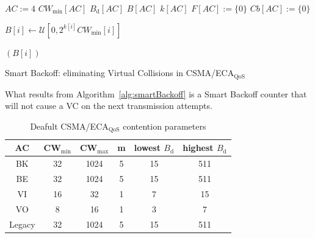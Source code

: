 
\begin{center}
\begin{minipage}{0.7\linewidth}
	\begin{algorithm}[H]
		$AC:=4$
		$CW_{\min}[AC]$
		$B_{\text{d}}[AC]$
		$B[AC]$
		$k[AC]$
		$F[AC]:=\{0\}$\;
		$Cb[AC]:=\{0\}$\;
		\tcp{}\tcp{}
		{
			$B[i]\gets\mathcal{U}[0,2^{k[i]}{CW_{\min}[i]}]$\;
			{
			}
			
			
		}
		\Return $(B[i])$\;
		\vspace{0.2cm}
		\caption{Smart Backoff: eliminating Virtual Collisions in CSMA/ECA$_{\text{QoS}}$}
		\label{alg:smartBackoff}
	\end{algorithm}
\end{minipage}
\end{center}

What results from Algorithm~\ref{alg:smartBackoff} is a Smart Backoff counter that will not cause a VC on the next transmission attempts.

	\begin{table}[tb]
		\centering
		\caption{Deafult CSMA/ECA$_{\text{QoS}}$ contention parameters}
		\label{tab:ecaQosParams}
		\begin{tabular}{|c|c|c|c|c|c|}
			\hline
			{\bfseries AC} & {\bfseries CW$_{\min}$} & {\bfseries CW$_{\max}$} & {\bfseries m} & {\bfseries lowest $B_{\text{d}}$} & {\bfseries highest $B_{\text{d}}$}\\
			\hline
			BK		       &	32				&		1024		  & 		5	&			15		        &		511\\
			BE		       &	32				&		1024		  &		5	&			15		        &		511\\
			VI		       &	16				&		32			  & 		1	&			7		        &		15\\
			VO		       &	8				&		16		 	 & 		1	&			3		        &		7\\
			Legacy	       &	32				&		1024		  & 		5	&			15		        &		511\\
			\hline
		\end{tabular}
	\end{table}

